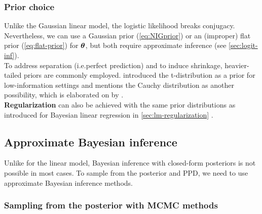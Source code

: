 \subsubsection*{Prior choice}

Unlike the Gaussian linear model, the logistic likelihood breaks conjugacy.
Nevertheless, we can use a Gaussian prior (\autoref{eq:NIGprior}) or an (improper) flat prior (\autoref{eq:flat-prior}) for $\bm{\theta}$, but both require approximate inference (see \autoref{sec:logit-inf}).\\

To address separation (i.e.\@ perfect prediction) and to induce shrinkage, heavier-tailed priors are commonly employed.
\citet{gelman_weakly_2008} introduced the t-distribution as a prior for low-information settings and mentions the Cauchy distribution as another possibility, which is elaborated on by .\\

\textbf{Regularization} can also be achieved with the same prior distributions as introduced for Bayesian linear regression in \autoref{sec:lm-regularization} .

\subsection{Approximate Bayesian inference} \label{sec:logit-inf}

Unlike for the linear model, Bayesian inference with closed-form posteriors is not possible in most cases.
To sample from the posterior and PPD, we need to use approximate Bayesian inference methods.

\subsubsection*{Sampling from the posterior with MCMC methods}

